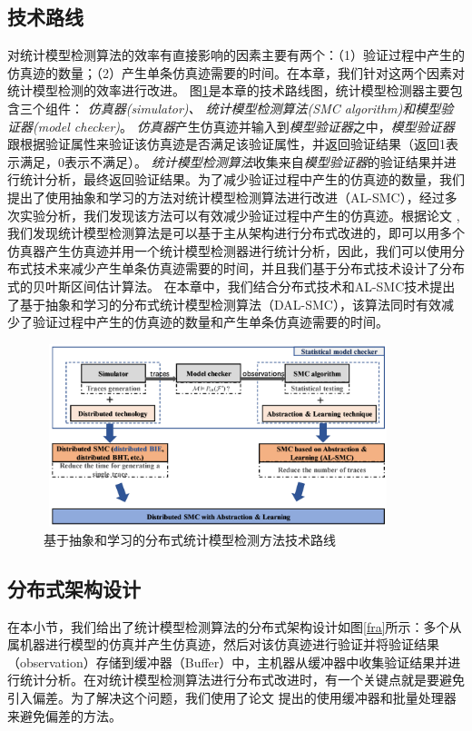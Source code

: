 \subsection{技术路线}
\label{sec:roadmap}
对统计模型检测算法的效率有直接影响的因素主要有两个：（1）验证过程中产生的仿真迹的数量；（2）产生单条仿真迹需要的时间。在本章，我们针对这两个因素对统计模型检测的效率进行改进。 图\ref{tech-map}是本章的技术路线图，统计模型检测器主要包含三个组件： \emph{仿真器(simulator)、 统计模型检测算法(SMC algorithm)和模型验证器(model checker)}。 \emph{仿真器}产生仿真迹并输入到\emph{模型验证器}之中，\emph{模型验证器}跟根据验证属性来验证该仿真迹是否满足该验证属性，并返回验证结果（返回1表示满足，0表示不满足）。 \emph{统计模型检测算法}收集来自\emph{模型验证器}的验证结果并进行统计分析，最终返回验证结果。为了减少验证过程中产生的仿真迹的数量，我们提出了使用抽象和学习的方法对统计模型检测算法进行改进（AL-SMC），经过多次实验分析，我们发现该方法可以有效减少验证过程中产生的仿真迹。根据论文  \cite{younes2005ymer}, 我们发现统计模型检测算法是可以基于主从架构进行分布式改进的，即可以用多个仿真器产生仿真迹并用一个统计模型检测器进行统计分析，因此，我们可以使用分布式技术来减少产生单条仿真迹需要的时间，并且我们基于分布式技术设计了分布式的贝叶斯区间估计算法。  在本章中，我们结合分布式技术和AL-SMC技术提出了基于抽象和学习的分布式统计模型检测算法（DAL-SMC），该算法同时有效减少了验证过程中产生的仿真迹的数量和产生单条仿真迹需要的时间。
\begin{figure}[htbp]
	{
	\centering	
	\includegraphics[width=4.0in,height=2.1in]{fig/4/paper-framework.png}
\caption{基于抽象和学习的分布式统计模型检测方法技术路线}\label{tech-map}	
	}	
\end{figure}
\subsection{分布式架构设计}
在本小节，我们给出了统计模型检测算法的分布式架构设计如图\ref{fra}所示：多个从属机器进行模型的仿真并产生仿真迹，然后对该仿真迹进行验证并将验证结果（observation）存储到缓冲器（Buffer）中，主机器从缓冲器中收集验证结果并进行统计分析。在对统计模型检测算法进行分布式改进时，有一个关键点就是要避免引入偏差。为了解决这个问题，我们使用了论文 \cite{Bulychev2012Checking}提出的使用缓冲器和批量处理器来避免偏差的方法。


